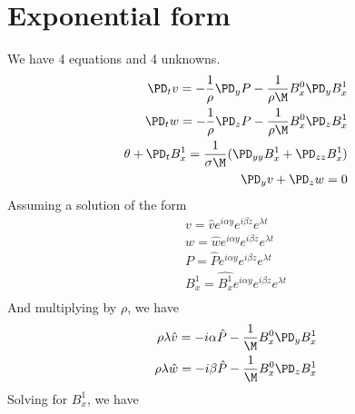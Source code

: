 \documentclass[11pt]{article}
\begin{document}
\section{Exponential form}
We have 4 equations and 4 unknowns.
\begin{equation}\begin{aligned}
\PD_t v = -\frac{1}{\rho}\PD_y P - \frac{1}{\rho \M} B_x^0 \PD_y B_x^{1} \\
\PD_t w = -\frac{1}{\rho}\PD_z P - \frac{1}{\rho \M} B_x^0 \PD_z B_x^{1} \\
\theta + \PD_t B_x^{1} = \frac{1}{\sigma \M} (\PD_{yy} B_x^{1}+\PD_{zz} B_x^{1}) \\
\PD_y v + \PD_z w = 0  \\
\end{aligned} \end{equation}
Assuming a solution of the form
\begin{equation}\begin{aligned}
v = \hat{v} e^{i\alpha y} e^{i\beta z} e^{\lambda t} \\
w = \hat{w} e^{i\alpha y} e^{i\beta z} e^{\lambda t} \\
P = \hat{P} e^{i\alpha y} e^{i\beta z} e^{\lambda t} \\
B_x^1 = \hat{B_x^1} e^{i\alpha y} e^{i\beta z} e^{\lambda t} \\
\end{aligned} \end{equation}
And multiplying by $\rho$, we have
\begin{equation}\begin{aligned}
\rho \lambda \hat{v} = -i \alpha \hat{P} - \frac{1}{\M} B_x^0 \PD_y B_x^{1} \\
\rho \lambda \hat{w} = -i \beta  \hat{P} - \frac{1}{\M} B_x^0 \PD_z B_x^{1} \\
\end{aligned} \end{equation}
Solving for $B_x^1$, we have
\end{document}
